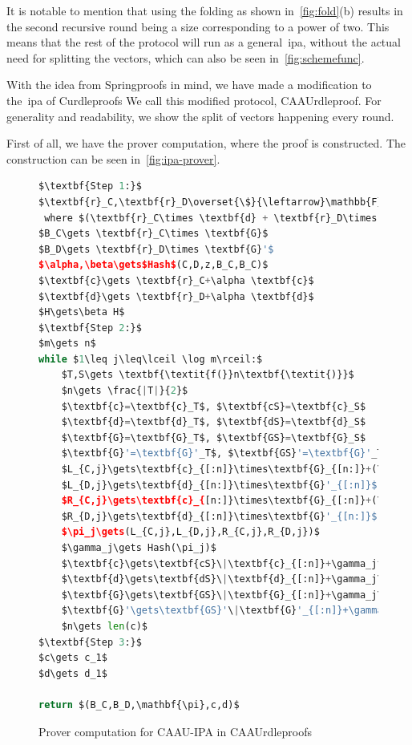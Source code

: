It is notable to mention that using the folding as shown in~\autoref{fig:fold}(b) results in the second recursive round being a size corresponding to a power of two.
This means that the rest of the protocol will run as a general~\gls{ipa}, without the actual need for splitting the vectors, which can also be seen in~\autoref{fig:schemefunc}.

With the idea from Springproofs in mind, we have made a modification to the~\gls{ipa} of Curdleproofs
We call this modified protocol, CAAUrdleproof.
For generality and readability, we show the split of vectors happening every round.

First of all, we have the prover computation, where the proof is constructed.
The construction can be seen in~\autoref{fig:ipa-prover}.

\begin{figure}[h]
\begin{framed}
    \begin{lstlisting}[language=Python,mathescape=true,label={lst:ipa-prover}]
$\textbf{Step 1:}$
$\textbf{r}_C,\textbf{r}_D\overset{\$}{\leftarrow}\mathbb{F}^n$
 where $(\textbf{r}_C\times \textbf{d} + \textbf{r}_D\times \textbf{c})=0\text{ and }\textbf{r}_C\times \textbf{r}_D=0$
$B_C\gets \textbf{r}_C\times \textbf{G}$
$B_D\gets \textbf{r}_D\times \textbf{G}'$
$\alpha,\beta\gets$Hash$(C,D,z,B_C,B_C)$
$\textbf{c}\gets \textbf{r}_C+\alpha \textbf{c}$
$\textbf{d}\gets \textbf{r}_D+\alpha \textbf{d}$
$H\gets\beta H$
$\textbf{Step 2:}$
$m\gets n$
while $1\leq j\leq\lceil \log m\rceil:$
    $T,S\gets \textbf{\textit{f(}}n\textbf{\textit{)}}$
    $n\gets \frac{|T|}{2}$
    $\textbf{c}=\textbf{c}_T$, $\textbf{cS}=\textbf{c}_S$
    $\textbf{d}=\textbf{d}_T$, $\textbf{dS}=\textbf{d}_S$
    $\textbf{G}=\textbf{G}_T$, $\textbf{GS}=\textbf{G}_S$
    $\textbf{G}'=\textbf{G}'_T$, $\textbf{GS}'=\textbf{G}'_T$
    $L_{C,j}\gets\textbf{c}_{[:n]}\times\textbf{G}_{[n:]}+(\textbf{c}_{[:n]}\times\textbf{d}_{[n:]})H$
    $L_{D,j}\gets\textbf{d}_{[n:]}\times\textbf{G}'_{[:n]}$
    $R_{C,j}\gets\textbf{c}_{[n:]}\times\textbf{G}_{[:n]}+(\textbf{c}_{[n:]}\times\textbf{d}_{[:n]})H$
    $R_{D,j}\gets\textbf{d}_{[:n]}\times\textbf{G}'_{[n:]}$
    $\pi_j\gets(L_{C,j},L_{D,j},R_{C,j},R_{D,j})$
    $\gamma_j\gets Hash(\pi_j)$
    $\textbf{c}\gets\textbf{cS}\|\textbf{c}_{[:n]}+\gamma_j^{-1}\textbf{c}_{[n:]}$
    $\textbf{d}\gets\textbf{dS}\|\textbf{d}_{[:n]}+\gamma_j\textbf{d}_{[n:]}$
    $\textbf{G}\gets\textbf{GS}\|\textbf{G}_{[:n]}+\gamma_j\textbf{G}_{[n:]}$
    $\textbf{G}'\gets\textbf{GS}'\|\textbf{G}'_{[:n]}+\gamma_j^{-1}\textbf{G}'_{[n:]}$
    $n\gets len(c)$
$\textbf{Step 3:}$
$c\gets c_1$
$d\gets d_1$

return $(B_C,B_D,\mathbf{\pi},c,d)$
    \end{lstlisting}
\end{framed}
\caption{Prover computation for CAAU-IPA in CAAUrdleproofs}
\label{fig:ipa-prover}
\end{figure}

